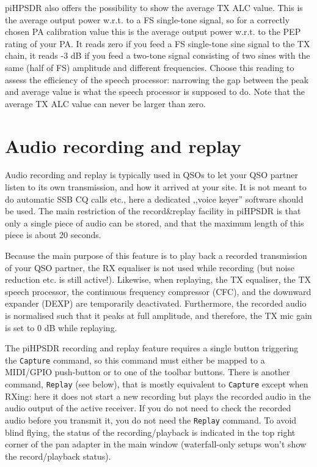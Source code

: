 \documentclass[12pt]{book}
\def\bltt#1{\texttt{\color{blue}#1}}
\def\pH{pi\-HPSDR\xspace}
\begin{document}
\pH also offers the possibility to show the average TX ALC value. This is the average output power
w.r.t. to a FS single-tone signal, so for a correctly chosen PA calibration value this is the
average output power w.r.t. to the PEP rating of your PA. It reads zero if you feed a FS single-tone
sine signal to the TX chain, it reads -3 dB if you feed a two-tone signal consisting of two sines
with the same (half of FS) amplitude and different frequencies. Choose this reading to assess
the efficiency of the speech processor: narrowing the gap between the peak and average value is
what the speech processor is supposed to do. Note that the average TX ALC value can never be larger
than zero.
\clearpage
\section{Audio recording and replay}
\label{sec:capture}
Audio recording and replay is typically used in QSOs to let your QSO partner listen to its own transmission,
and how it arrived at your site. It is not meant to do automatic SSB CQ calls etc., here a dedicated
,,voice keyer'' software should be used. The main restriction of the record\&replay facility in \pH is
that only a single piece of audio can be stored, and that the maximum length of this piece is about 20 seconds.

Because the main purpose of this feature is to play back a recorded transmission of your QSO partner,
the RX equaliser is not used while recording (but noise reduction etc. is still active!). Likewise,
when replaying, the TX equaliser, the TX speech processor, the continuous frequency compressor (CFC),
and the downward expander (DEXP)
are temporarily deactivated. Furthermore, the recorded audio is normalised such that it peaks at full
amplitude, and therefore, the TX mic gain is set to 0 dB while replaying.

The \pH recording and replay feature requires a single button triggering the \bltt{Capture} command,
so this command must either be mapped to a MIDI/GPIO push-button or to one of the toolbar buttons.
There is another command, \bltt{Replay} (see below), that is mostly equivalent to \bltt{Capture}
except when RXing: here it does not start a new recording but plays the recorded audio in
the audio output of the active receiver. If you do not need to check the recorded audio before
you transmit it, you do not need the \bltt{Replay} command.
To avoid blind flying, the status of the recording/playback is indicated in the top right corner of
the pan adapter in the main window (waterfall-only setups won't show the record/playback status).
\end{document}
